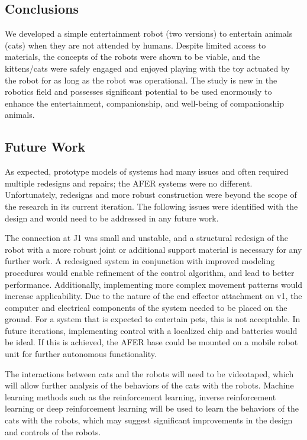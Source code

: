 \subsection {Conclusions}
We developed a simple entertainment robot (two versions) to entertain animals (cats) when they are not attended by humans. Despite limited access to materials, the concepts of the robots were shown to be viable, and the kittens/cats were safely engaged and enjoyed playing with the toy actuated by the robot for as long as the robot was operational. The study is new in the robotics field and possesses significant potential to be used enormously to enhance the entertainment, companionship, and well-being of companionship animals.

\subsection {Future Work}
As expected, prototype models of systems had many issues and often required multiple redesigns and repairs; the AFER systems were no different. Unfortunately, redesigns and more robust construction were beyond the scope of the research in its current iteration. The following issues were identified with the design and would need to be addressed in any future work.
     \par The connection at J1 was small and unstable, and a structural redesign of the robot with a more robust joint or additional support material is necessary for any further work. A redesigned system in conjunction with improved modeling procedures would enable refinement of the control algorithm, and lead to better performance. Additionally, implementing more complex movement patterns would increase applicability.
Due to the nature of the end effector attachment on v1, the computer and electrical components of the system needed to be placed on the ground. For a system that is expected to entertain pets, this is not acceptable. In future iterations, implementing control with a localized chip and batteries would be ideal. If this is achieved, the AFER base could be mounted on a mobile robot unit for further autonomous functionality.
    \par The interactions between cats and the robots will need to be videotaped, which will allow further analysis of the behaviors of the cats with the robots. Machine learning methods such as the reinforcement learning, inverse reinforcement learning or deep reinforcement learning will be used to learn the behaviors of the cats with the robots, which may suggest significant improvements in the design and controls of the robots.
